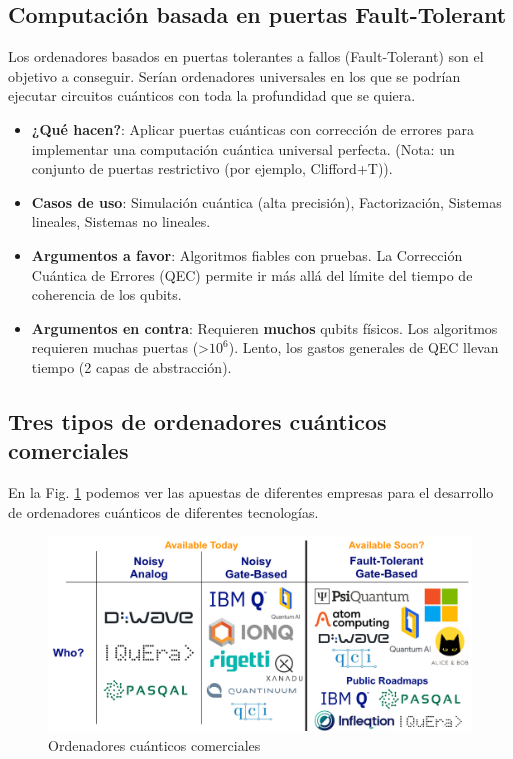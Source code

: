 \subsection{Computación basada en puertas Fault-Tolerant}


Los ordenadores basados en puertas tolerantes a fallos (Fault-Tolerant) son el objetivo a conseguir. Serían ordenadores universales en los que se podrían ejecutar circuitos cuánticos con toda la profundidad que se quiera.

\begin{itemize}
\item \textbf{¿Qué hacen?}: Aplicar puertas cuánticas con corrección de errores para implementar una computación cuántica universal perfecta. (Nota: un conjunto de puertas restrictivo (por ejemplo, Clifford+T)).

\item \textbf{Casos de uso}: Simulación cuántica (alta precisión), Factorización, Sistemas lineales, Sistemas no lineales.

\item \textbf{Argumentos a favor}: Algoritmos fiables con pruebas. La Corrección Cuántica de Errores (QEC) permite ir más allá del límite del tiempo de coherencia de los qubits.

\item \textbf{Argumentos en contra}: Requieren \textbf{muchos} qubits físicos. Los algoritmos requieren muchas puertas (>$10^6$). Lento, los gastos generales de QEC llevan tiempo (2 capas de abstracción).

\end{itemize}


\subsection{Tres tipos de ordenadores cuánticos comerciales}

En la Fig. \ref{Fig_Hardware_ordenadores_comerciales} podemos ver las apuestas de diferentes empresas para el desarrollo de ordenadores cuánticos de diferentes tecnologías.

	\begin{figure}[t]
	\centering 
	\includegraphics[width=1\linewidth]{Figuras/Fig_Hardware_ordenadores_comerciales.png}
	\caption{Ordenadores cuánticos comerciales}
	\label{Fig_Hardware_ordenadores_comerciales}
	\end{figure}










